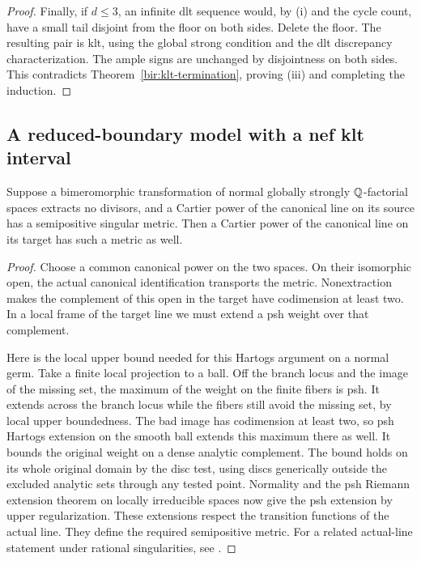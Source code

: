 \begin{proof}
Finally, if $d\leq3$, an infinite dlt sequence would, by (i) and the
cycle count, have a small tail disjoint from the floor on both
sides.  Delete the floor.  The resulting pair is klt, using the
global strong condition and the dlt discrepancy characterization.
The ample signs are unchanged by disjointness on both sides.
This contradicts Theorem~\ref{bir:klt-termination}, proving (iii)
and completing the induction.
\end{proof}

\subsection{A reduced-boundary model with a nef klt interval}
\label{bir:reduced-section}

\begin{lemma}
\label{bir:pseudoeffective-transport}
Suppose a bimeromorphic transformation of normal globally strongly
$\mathbb{Q}$-factorial spaces extracts no divisors, and a Cartier power of
the canonical line on its source has a semipositive singular metric.
Then a Cartier power of the canonical line on its target has such
a metric as well.
\end{lemma}

\begin{proof}
Choose a common canonical power on the two spaces.  On their
isomorphic open, the actual canonical identification transports the
metric.  Nonextraction makes the complement of this open in the
target have codimension at least two.  In a local frame of the
target line we must extend a psh weight over that complement.

Here is the local upper bound needed for this Hartogs argument on a
normal germ.  Take a finite local projection to a ball.  Off the
branch locus and the image of the missing set, the maximum of the
weight on the finite fibers is psh.  It extends across the branch
locus while the fibers still avoid the missing set, by local upper
boundedness.  The bad image has codimension at least two, so psh
Hartogs extension on the smooth ball extends this maximum there as
well.  It bounds the original weight on a dense analytic complement.
The bound holds on its whole original domain by the disc test,
using discs generically outside the excluded analytic sets through
any tested point.  Normality and the psh Riemann extension theorem
on locally irreducible spaces now give the psh extension by upper
regularization.  These extensions respect the transition functions
of the actual line.  They define the required semipositive metric.
For a related actual-line statement under rational singularities,
see \cite[Lemma~3.6]{HLLNonvanishing}.
\end{proof}

